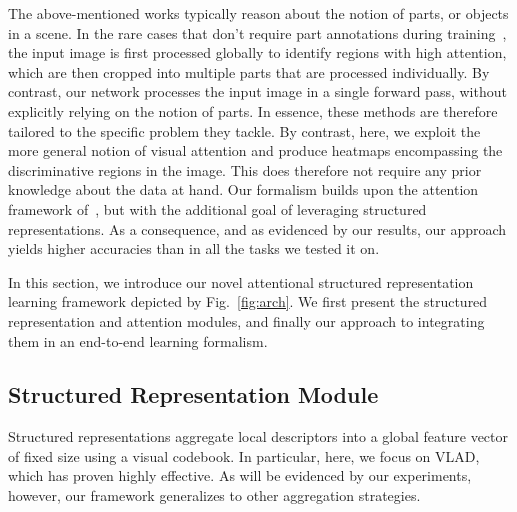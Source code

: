 \documentclass{bmvc2k}
\newcommand{\ms}[1]{{\color{blue}{#1}}}
\newcommand{\ms}[1]{ #1 }
\begin{document}
The above-mentioned works typically reason about the notion of parts, or objects in a scene. In the rare cases that don't require part annotations during training~\cite{RACNN2017,MACNN2017}, the input image is first processed globally to identify regions with high attention, which are then cropped into multiple parts that are processed individually. By contrast, our network processes the input image in a single forward pass, without explicitly relying on the notion of parts.  
In essence, these methods are therefore tailored to the specific problem they tackle. By contrast, here, we exploit the more general notion of visual attention and produce heatmaps encompassing the discriminative regions in the image. This does therefore not require any prior knowledge about the data at hand. Our formalism builds upon the attention framework of~\cite{Attpool}, but with the additional goal of leveraging structured representations. As a consequence, and as evidenced by our results, our approach yields higher accuracies than \ms{both attention-less methods and unstructured attentional pooling} in all the tasks we tested it on.


In this section, we introduce our novel attentional structured representation learning framework depicted by Fig.~\ref{fig:arch}.
We first present the structured representation and attention modules, and finally our approach to integrating them in an end-to-end learning formalism.

\subsection{Structured Representation Module}\label{sec:structured}

Structured representations aggregate local descriptors into a global feature vector of fixed size using a visual codebook. In particular, here, we focus on VLAD, which has proven highly effective. As will be evidenced by our experiments, however, our framework generalizes to other aggregation strategies.
\end{document}
